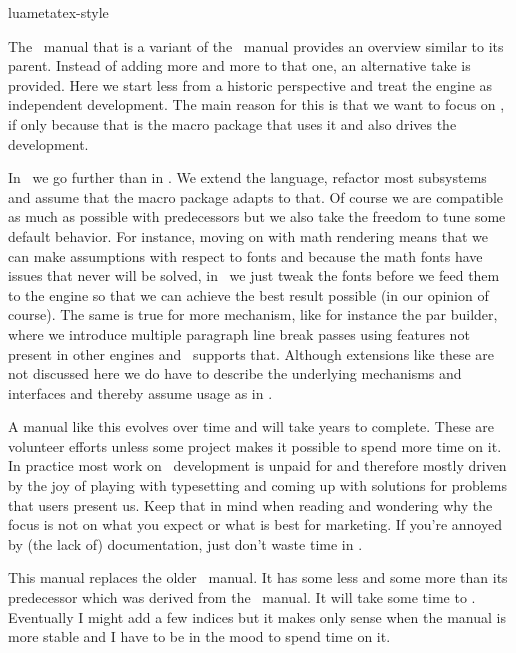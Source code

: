 
\environment luametatex-style

\startdocument[title=Introduction]

The \LUAMETATEX\ manual that is a variant of the \LUATEX\ manual provides an
overview similar to its parent. Instead of adding more and more to that one, an
alternative take is provided. Here we start less from a historic perspective and
treat the engine as independent development. The main reason for this is that we
want to focus on \CONTEXT, if only because that is the macro package that uses it
and also drives the development.

In \LUAMETATEX\ we go further than in \LUATEX. We extend the language, refactor
most subsystems and assume that the macro package adapts to that. Of course we
are compatible as much as possible with predecessors but we also take the freedom
to tune some default behavior. For instance, moving on with math rendering means
that we can make assumptions with respect to fonts and because the math fonts
have issues that never will be solved, in \CONTEXT\ we just tweak the fonts
before we feed them to the engine so that we can achieve the best result possible
(in our opinion of course). The same is true for more mechanism, like for
instance the par builder, where we introduce multiple paragraph line break passes
using features not present in other engines and \CONTEXT\ supports that. Although
extensions like these are not discussed here we do have to describe the
underlying mechanisms and interfaces and thereby assume usage as in \CONTEXT.

A manual like this evolves over time and will take years to complete. These are
volunteer efforts unless some project makes it possible to spend more time on it.
In practice most work on \TEX\ development is unpaid for and therefore mostly
driven by the joy of playing with typesetting and coming up with solutions for
problems that users present us. Keep that in mind when reading and wondering why
the focus is not on what you expect or what is best for marketing. If you're
annoyed by (the lack of) documentation, just don't waste time in \LUAMETATEX.

This manual replaces the older \LUAMETATEX\ manual. It has some less and some
more than its predecessor which was derived from the \LUATEX\ manual. It will
take some time to . Eventually I might add a few indices but it
makes only sense when the manual is more stable and I have to be in the mood to
spend time on it.

